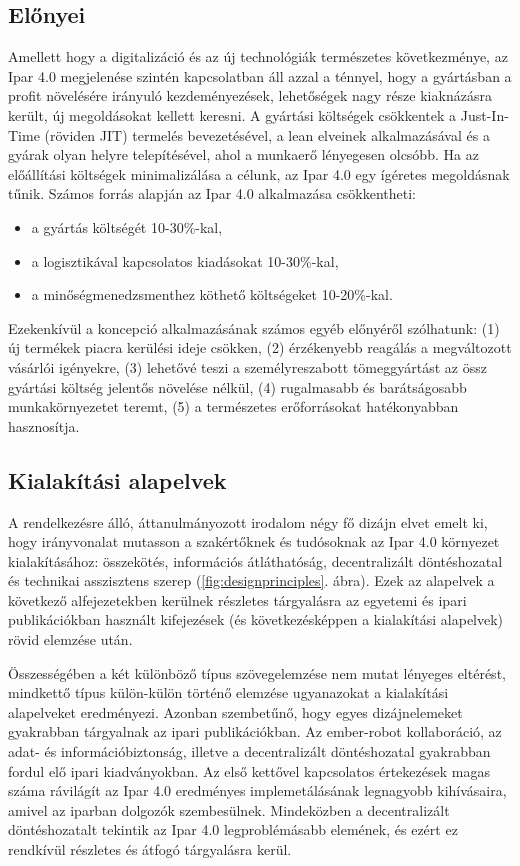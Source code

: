 \documentclass[../documentation.tex]{subfiles}
\begin{document}
\subsection{Előnyei}
Amellett hogy a digitalizáció és az új technológiák természetes következménye, az Ipar 4.0 megjelenése szintén kapcsolatban áll azzal a ténnyel, hogy a gyártásban a profit növelésére irányuló kezdeményezések, lehetőségek nagy része kiaknázásra került, új megoldásokat kellett keresni. A gyártási költségek csökkentek a Just-In-Time (röviden JIT) termelés bevezetésével, a lean elveinek alkalmazásával és a gyárak olyan helyre telepítésével, ahol a munkaerő lényegesen olcsóbb. Ha az előállítási költségek minimalizálása a célunk, az Ipar 4.0 egy ígéretes megoldásnak tűnik. Számos forrás alapján az Ipar 4.0 alkalmazása csökkentheti\cite{industryresults}:
\begin{itemize}
	\item a gyártás költségét 10-30\%-kal,
	\item a logisztikával kapcsolatos kiadásokat 10-30\%-kal,
	\item a minőségmenedzsmenthez köthető költségeket 10-20\%-kal.
\end{itemize}

Ezekenkívül a koncepció alkalmazásának számos egyéb előnyéről szólhatunk: (1) új termékek piacra kerülési ideje csökken, (2) érzékenyebb reagálás a megváltozott vásárlói igényekre, (3) lehetővé teszi a személyreszabott tömeggyártást az össz gyártási költség jelentős növelése nélkül, (4) rugalmasabb és barátságosabb munkakörnyezetet teremt, (5) a természetes erőforrásokat hatékonyabban hasznosítja.

\subsection{Kialakítási alapelvek}
A rendelkezésre álló, áttanulmányozott irodalom négy fő dizájn elvet emelt ki, hogy irányvonalat mutasson a szakértőknek és tudósoknak az Ipar 4.0 környezet kialakításához: összekötés, információs átláthatóság, decentralizált döntéshozatal és technikai asszisztens szerep (\ref{fig:designprinciples}. ábra). Ezek az alapelvek a következő alfejezetekben kerülnek részletes tárgyalásra az egyetemi és ipari publikációkban használt kifejezések (és következésképpen a kialakítási alapelvek) rövid elemzése után.

Összességében a két különböző típus szövegelemzése nem mutat lényeges eltérést, mindkettő típus külön-külön történő elemzése ugyanazokat a kialakítási alapelveket eredményezi. Azonban szembetűnő, hogy egyes dizájnelemeket gyakrabban tárgyalnak az ipari publikációkban. Az ember-robot kollaboráció, az adat- és információbiztonság, illetve a decentralizált döntéshozatal gyakrabban fordul elő ipari kiadványokban. Az első kettővel kapcsolatos értekezések magas száma rávilágít az Ipar 4.0 eredményes implemetálásának legnagyobb kihívásaira, amivel az iparban dolgozók szembesülnek. Mindeközben a decentralizált döntéshozatalt tekintik az Ipar 4.0 legproblémásabb elemének, és ezért ez rendkívül részletes és átfogó tárgyalásra kerül.
\end{document}
